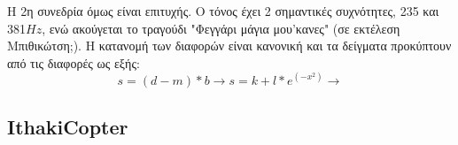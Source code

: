 \documentclass[a4paper,10pt]{article}
\begin{document}
Η 2η συνεδρία όμως είναι επιτυχής. Ο τόνος έχει 2 σημαντικές συχνότητες, 235 και 381$Hz$, ενώ ακούγεται το τραγούδι "Φεγγάρι μάγια μου'κανες" (σε εκτέλεση Μπιθικώτση;).
Η κατανομή των διαφορών είναι κανονική και τα δείγματα προκύπτουν από τις διαφορές ως εξής:
$$s= (d-m)*b \rightarrow s= k+l*e^(-x^2) \rightarrow $$


\subsection{\foreignlanguage{english}{IthakiCopter}}
\end{document}
